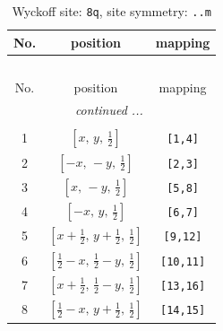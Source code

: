 \documentclass[fleqn,8pt]{jsarticle}
\begin{document}
\begin{longtable}{ccc}
\caption{Wyckoff site: {\tt 8q}, site symmetry: {\tt ..m}}
 \\
 \hline \hline
No. & position & mapping \\ \hline \endfirsthead

\multicolumn{2}{l}{\tablename\ \thetable{}} \\
 \hline \hline
No. & position & mapping \\ \hline \endhead

 \hline \hline
\multicolumn{2}{r}{\footnotesize\it continued ...} \\ \endfoot

 \hline \hline
\multicolumn{2}{r}{} \\ \endlastfoot

1 & $\left[ x,\, y,\, \frac{1}{2} \right]$ & {\tt [1,4]} \\ \hline
2 & $\left[ - x,\, - y,\, \frac{1}{2} \right]$ & {\tt [2,3]} \\ \hline
3 & $\left[ x,\, - y,\, \frac{1}{2} \right]$ & {\tt [5,8]} \\ \hline
4 & $\left[ - x,\, y,\, \frac{1}{2} \right]$ & {\tt [6,7]} \\ \hline
5 & $\left[ x + \frac{1}{2},\, y + \frac{1}{2},\, \frac{1}{2} \right]$ & {\tt [9,12]} \\ \hline
6 & $\left[ \frac{1}{2} - x,\, \frac{1}{2} - y,\, \frac{1}{2} \right]$ & {\tt [10,11]} \\ \hline
7 & $\left[ x + \frac{1}{2},\, \frac{1}{2} - y,\, \frac{1}{2} \right]$ & {\tt [13,16]} \\ \hline
8 & $\left[ \frac{1}{2} - x,\, y + \frac{1}{2},\, \frac{1}{2} \right]$ & {\tt [14,15]} \\
\end{longtable}
\renewcommand{\arraystretch}{1.2}
\end{document}
